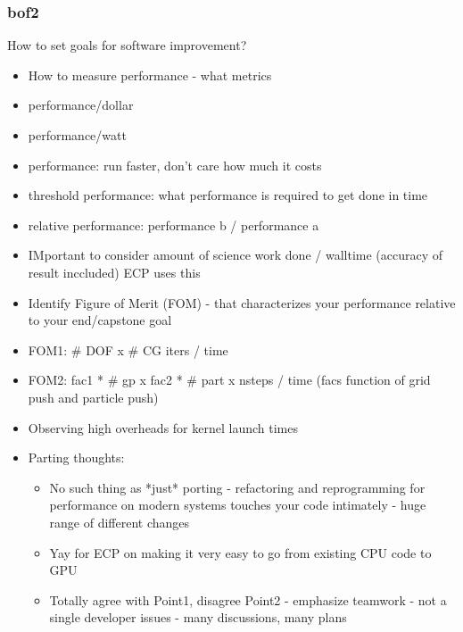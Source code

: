 \begin{frame}\frametitle{bof2}
How to set goals for software improvement?
\begin{itemize}
\item How to measure performance - what metrics
\item performance/dollar
\item performance/watt
\item performance: run faster, don't care how much it costs
\item threshold performance: what performance is required to get done in time
\item relative performance: performance b / performance a
\item IMportant to consider amount of science work done / walltime (accuracy of result inccluded) ECP uses this
\item Identify Figure of Merit (FOM) - that characterizes your performance relative to your end/capstone goal
\item FOM1: \# DOF x \# CG iters / time
\item FOM2: fac1 * \# gp x fac2 * \# part x nsteps / time (facs function of grid push and particle push)
\item Observing high overheads for kernel launch times
\item Parting thoughts:
\begin{itemize}
\item No such thing as *just* porting - refactoring and reprogramming for performance on modern systems touches your code intimately - huge range of different changes
\item Yay for ECP on making it very easy to go from existing CPU code to GPU
\item Totally agree with Point1, disagree Point2 - emphasize teamwork - not a single developer issues - many discussions, many plans
\end{itemize}
\end{itemize}
\end{frame}

